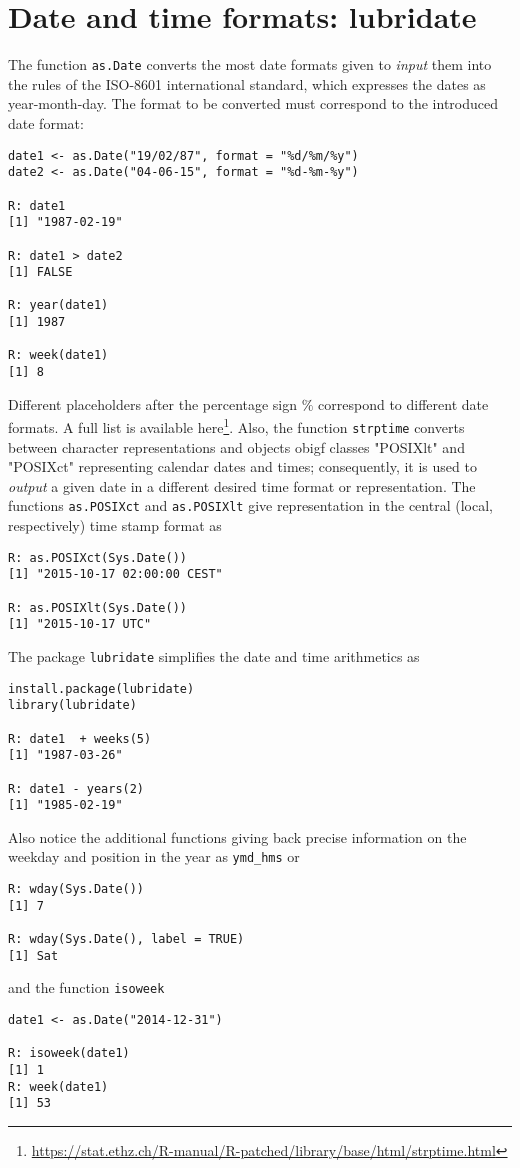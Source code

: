 \chapter{Date and time formats: lubridate}\label{sec: time}
The function \texttt{as.Date} converts the most
date formats given to \emph{input} them 
into the rules of the ISO-8601 
international standard, which expresses the dates
as year-month-day. The format to be converted 
must correspond to the introduced date format:
\begin{verbatim}
date1 <- as.Date("19/02/87", format = "%d/%m/%y")
date2 <- as.Date("04-06-15", format = "%d-%m-%y")

R: date1
[1] "1987-02-19"

R: date1 > date2
[1] FALSE

R: year(date1)
[1] 1987

R: week(date1)
[1] 8
\end{verbatim}

Different placeholders after the percentage sign $\%$
correspond to different date formats. A full list is
available here\footnote{
\url{https://stat.ethz.ch/R-manual/R-patched/library/base/html/strptime.html}}.
Also, the function \texttt{strptime} converts between character 
representations and objects obigf classes "POSIXlt" 
and "POSIXct" representing calendar dates and times;
consequently, it is used to \emph{output} a given date in a 
different desired time format or representation.
\medskip 
The functions \texttt{as.POSIXct} and \texttt{as.POSIXlt}
give representation in the central (local, respectively)
time stamp format as
\begin{verbatim}
R: as.POSIXct(Sys.Date())
[1] "2015-10-17 02:00:00 CEST"

R: as.POSIXlt(Sys.Date())
[1] "2015-10-17 UTC" 
\end{verbatim}
\bigskip

The package \texttt{lubridate} simplifies the date and
time arithmetics as
\begin{verbatim}
install.package(lubridate)
library(lubridate)

R: date1  + weeks(5)
[1] "1987-03-26"

R: date1 - years(2)
[1] "1985-02-19"
\end{verbatim}
Also notice the additional functions giving back
precise information on the weekday and position in
the year as \texttt{ymd\_hms} or 
\begin{verbatim}
R: wday(Sys.Date())
[1] 7

R: wday(Sys.Date(), label = TRUE)
[1] Sat 
\end{verbatim}
and the function \texttt{isoweek}
\begin{verbatim}
date1 <- as.Date("2014-12-31")

R: isoweek(date1)
[1] 1
R: week(date1)
[1] 53
\end{verbatim}
